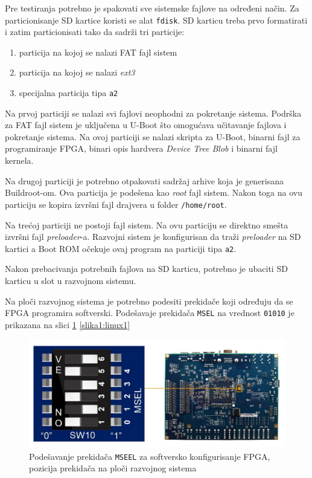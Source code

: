 Pre testiranja potrebno je spakovati sve sistemske fajlove na određeni način. Za particionisanje SD kartice koristi se alat \texttt{fdisk}. SD karticu treba prvo formatirati i zatim particionisati tako da sadrži tri particije:
\begin{enumerate}
\item particija na kojoj se nalazi FAT fajl sistem
\item particija na kojoj se nalazi \textit{ext3}
\item specijalna particija tipa \texttt{a2}
\end{enumerate}

Na prvoj particiji se nalazi svi fajlovi neophodni za pokretanje sistema. Podrška za FAT fajl sistem je uključena u U-Boot što omogućava učitavanje fajlova i pokretanje sistema. Na ovoj particiji se nalazi skripta za U-Boot, binarni fajl za programiranje FPGA, binari opis hardvera \textit{Device Tree Blob} i binarni fajl kernela.

Na drugoj particiji je potrebno otpakovati sadržaj arhive koja je generisana Buildroot-om.
Ova particija je podešena kao \textit{root} fajl sistem. Nakon toga na ovu particiju se kopira izvršni fajl drajvera u folder \texttt{/home/root}.

Na trećoj particiji ne postoji fajl sistem. Na ovu particiju se direktno smešta izvršni fajl \textit{preloader}-a. Razvojni sistem je konfigurisan da traži \textit{preloader} na SD kartici a Boot ROM očekuje ovaj program na particiji tipa \texttt{a2}.

Nakon prebacivanja potrebnih fajlova na SD karticu, potrebno je ubaciti SD karticu u slot u razvojnom sistemu. 

Na ploči razvojnog sistema je potrebno podesiti prekidače koji određuju da se FPGA programira softverski. Podešavaje prekidača \texttt{MSEL} na vrednost \texttt{01010} je prikazana na slici \ref{slika1:de1}
\ref{slika1:linux1}
\begin{figure}[h!]
\centering
\includegraphics[scale=0.4]{img/de1.png}
\caption{Podešavanje prekidača \texttt{MSEEL} za softversko konfigurisanje FPGA, pozicija prekidača na ploči razvojnog sistema}
\label{slika1:de1}
\end{figure}

